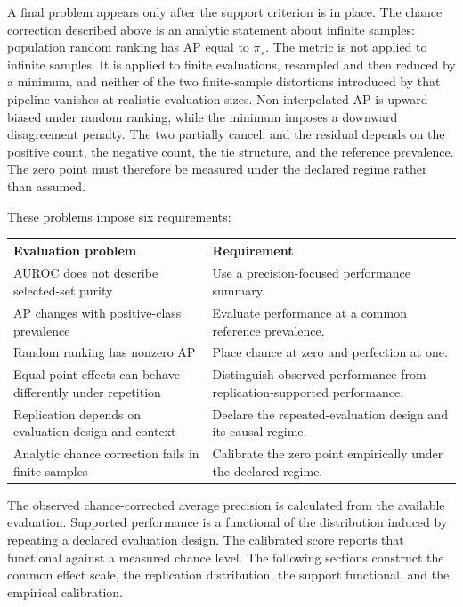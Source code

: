 \documentclass[11pt]{article}
\theoremstyle{remark}
\begin{document}
A final problem appears only after the support criterion is in place. The chance correction described above is an analytic statement about infinite samples: population random ranking has AP equal to $\pi_\star$. The metric is not applied to infinite samples. It is applied to finite evaluations, resampled and then reduced by a minimum, and neither of the two finite-sample distortions introduced by that pipeline vanishes at realistic evaluation sizes. Non-interpolated AP is upward biased under random ranking, while the minimum imposes a downward disagreement penalty. The two partially cancel, and the residual depends on the positive count, the negative count, the tie structure, and the reference prevalence. The zero point must therefore be measured under the declared regime rather than assumed.

These problems impose six requirements:

\begin{tabularx}{\textwidth}{@{}>{\raggedright\arraybackslash}p{}>{\raggedright\arraybackslash}X@{}}
\toprule
Evaluation problem & Requirement \\
\midrule
AUROC does not describe selected-set purity & Use a precision-focused performance summary. \\
AP changes with positive-class prevalence & Evaluate performance at a common reference prevalence. \\
Random ranking has nonzero AP & Place chance at zero and perfection at one. \\
Equal point effects can behave differently under repetition & Distinguish observed performance from replication-supported performance. \\
Replication depends on evaluation design and context & Declare the repeated-evaluation design and its causal regime. \\
Analytic chance correction fails in finite samples & Calibrate the zero point empirically under the declared regime. \\
\bottomrule
\end{tabularx}

The observed chance-corrected average precision is calculated from the available evaluation. Supported performance is a functional of the distribution induced by repeating a declared evaluation design. The calibrated score reports that functional against a measured chance level. The following sections construct the common effect scale, the replication distribution, the support functional, and the empirical calibration.
\end{document}
